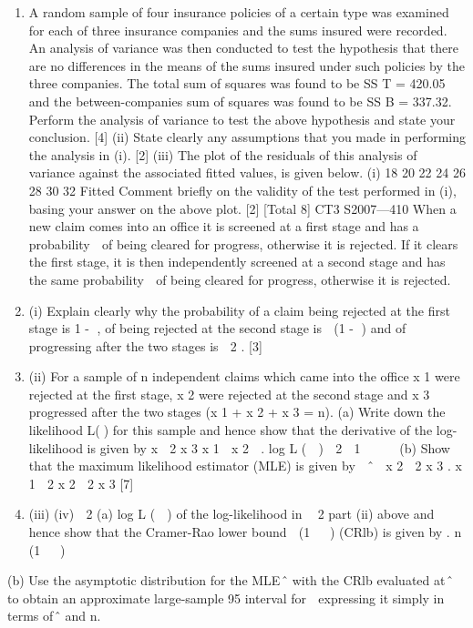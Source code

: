 \documentclass[a4paper,12pt]{article}
\begin{document}
\begin{enumerate}%
\item A random sample of four insurance policies of a certain type was examined for each of three insurance companies and the sums insured were recorded. An analysis of variance was then conducted to test the hypothesis that there are no differences in the
means of the sums insured under such policies by the three companies.
The total sum of squares was found to be SS T = 420.05 and the between-companies
sum of squares was found to be SS B = 337.32.
Perform the analysis of variance to test the above hypothesis and state your
conclusion.
[4]
(ii) State clearly any assumptions that you made in performing the analysis in (i).
[2]
(iii) The plot of the residuals of this analysis of variance against the associated
fitted values, is given below.
(i)
18
20
22
24
26
28
30
32
Fitted
Comment briefly on the validity of the test performed in (i), basing your
answer on the above plot.
[2]
[Total 8]
CT3 S2007—410
\ite When a new claim comes into an office it is screened at a first stage and has a probability  of being cleared for progress, otherwise it is rejected. If it clears the first stage, it is then independently screened at a second stage and has the same probability
 of being cleared for progress, otherwise it is rejected.
\item (i) Explain clearly why the probability of a claim being rejected at the first stage
is 1 - , of being rejected at the second stage is  (1 - ) and of progressing after the two stages is  2 .
[3]
\item (ii) For a sample of n independent claims which came into the office x 1 were rejected at the first stage, x 2 were rejected at the second stage and x 3
progressed after the two stages (x 1 + x 2 + x 3 = n).
(a)
Write down the likelihood L() for this sample and hence show that the derivative of the log-likelihood is given by
x  2 x 3 x 1  x 2

.
log L (  )  2

1  


(b)
Show that the maximum likelihood estimator (MLE) is given by
 ˆ 
x 2  2 x 3
.
x 1  2 x 2  2 x 3
[7]
\item (iii)
(iv)

2
(a) log L (  ) of the log-likelihood in
 2
part (ii) above and hence show that the Cramer-Rao lower bound
 (1   )
(CRlb) is given by
.
n (1   )
\end{enumerate}
(b) Use the asymptotic distribution for the MLE ̂ with the CRlb
evaluated at ̂ to obtain an approximate large-sample 95%
interval for  expressing it simply in terms of ̂ and n.
\end{document}
